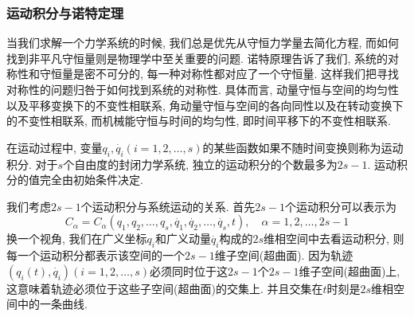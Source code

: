 \documentclass[a4paper,11pt]{article}
\theoremstyle{mystyle}
\begin{document}
\subsubsection{运动积分与诺特定理}
当我们求解一个力学系统的时候, 我们总是优先从守恒力学量去简化方程, 而如何找到非平凡守恒量则是物理学中至关重要的问题. 诺特原理告诉了我们, 系统的对称性和守恒量是密不可分的, 每一种对称性都对应了一个守恒量. 这样我们把寻找对称性的问题归咎于如何找到系统的对称性. 具体而言, 动量守恒与空间的均匀性以及平移变换下的不变性相联系, 角动量守恒与空间的各向同性以及在转动变换下的不变性相联系, 而机械能守恒与时间的均匀性, 即时间平移下的不变性相联系.
\begin{definition}[运动积分]
  在运动过程中, 变量$q_i,\dot{q_i}(i=1,2,\dots,s)$的某些函数如果不随时间变换则称为运动积分. 对于$s$个自由度的封闭力学系统, 独立的运动积分的个数最多为$2s-1$. 运动积分的值完全由初始条件决定.
\end{definition}
我们考虑$2s-1$个运动积分与系统运动的关系. 首先$2s-1$个运动积分可以表示为
\begin{equation*}
  C_\alpha=C_\alpha(q_1,q_2,\dots,q_s,\dot{q_1},\dot{q_2},\dots,\dot{q_s},t),\quad \alpha=1,2,\dots,2s-1
\end{equation*}
换一个视角, 我们在广义坐标$q_i$和广义动量$\dot{q_i}$构成的$2s$维相空间中去看运动积分, 则每一个运动积分都表示该空间的一个$2s-1$维子空间(超曲面). 因为轨迹$(q_i(t),\dot{q_i})(i=1,2,\dots,s)$必须同时位于这$2s-1$个$2s-1$维子空间(超曲面)上, 这意味着轨迹必须位于这些子空间(超曲面)的交集上. 并且交集在$t$时刻是$2s$维相空间中的一条曲线.
\end{document}
